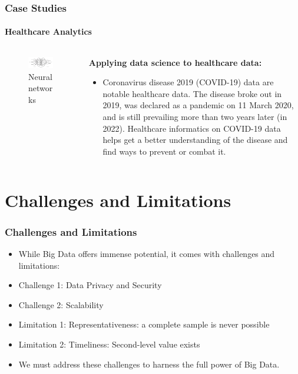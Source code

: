 \documentclass{beamer}
\begin{document}
	\begin{frame}
	\frametitle{Case Studies}
	\framesubtitle{Healthcare Analytics}
		\begin{columns}
			\begin{column}{0.5\textwidth} %
      		\begin{figure}
        		\includegraphics[width=\linewidth]{resources/deeplearning.png} %
        		\caption{Neural networks}
      		\end{figure}
    		\end{column}
    		\begin{column}{0.5\textwidth} %
      		\textbf{Applying data science to healthcare data:}
      		\begin{itemize}
        		\item Coronavirus disease 2019 (COVID-19) data are notable healthcare data. The disease broke out in 2019, was declared as a pandemic on 11 March 2020, and is still prevailing more than two years later (in 2022). Healthcare informatics on COVID-19 data helps get a better understanding of the disease and find ways to prevent or combat it.
      		\end{itemize}
    		\end{column}
		\end{columns}
	\end{frame}
	
\section{Challenges and Limitations}
	\begin{frame}
	\frametitle{Challenges and Limitations}
		\begin{itemize}
  			\item While Big Data offers immense potential, it comes with challenges and limitations:
  			\item Challenge 1: Data Privacy and Security
  			\item Challenge 2: Scalability
  			\item Limitation 1: Representativeness: a complete sample is never possible
  			\item Limitation 2: Timeliness: Second-level value exists
  			\item We must address these challenges to harness the full power of Big Data.
		\end{itemize}
	\end{frame}
	
\end{document}

